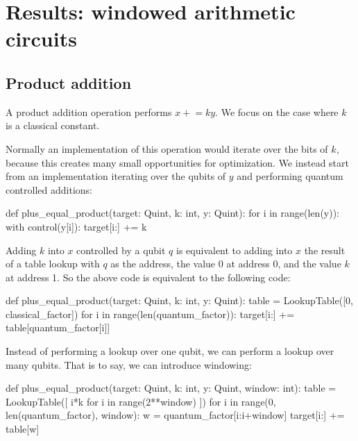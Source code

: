 \documentclass[onecolumn,unpublished]{quantumarticle}
\theoremstyle{definition}
\theoremstyle{definition}
\theoremstyle{definition}
\newcommand{\pluseq}{\mathrel{+}=}
\begin{document}
\section{Results: windowed arithmetic circuits}
\label{sec:results}

\subsection{Product addition}

A product addition operation performs $x \pluseq ky$.
We focus on the case where $k$ is a classical constant.

Normally an implementation of this operation would iterate over the bits of $k$, because this creates many small opportunities for optimization.
We instead start from an implementation iterating over the qubits of $y$ and performing quantum controlled additions:

\begin{python}
    def plus_equal_product(target: Quint, k: int, y: Quint):
        for i in range(len(y)):
            with control(y[i]):
                target[i:] += k
\end{python}

Adding $k$ into $x$ controlled by a qubit $q$ is equivalent to adding into $x$ the result of a table lookup with $q$ as the address, the value $0$ at address 0, and the value $k$ at address 1.
So the above code is equivalent to the following code:

\begin{python}
    def plus_equal_product(target: Quint, k: int, y: Quint):
        table = LookupTable([0, classical_factor])
        for i in range(len(quantum_factor)):
            target[i:] += table[quantum_factor[i]]
\end{python}

Instead of performing a lookup over one qubit, we can perform a lookup over many qubits.
That is to say, we can introduce windowing:

\begin{python}
    def plus_equal_product(target: Quint,
                           k: int,
                           y: Quint,
                           window: int):
        table = LookupTable([
            i*k
            for i in range(2**window)
        ])
        for i in range(0, len(quantum_factor), window):
            w = quantum_factor[i:i+window]
            target[i:] += table[w]
\end{python}
\end{document}
